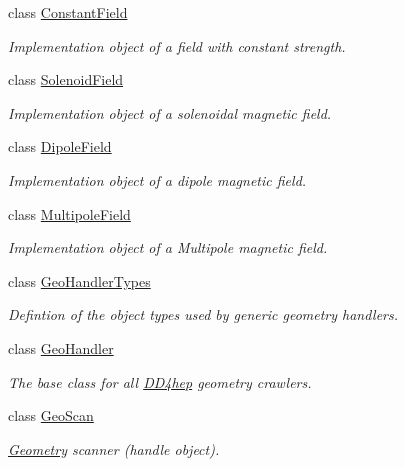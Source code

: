 \begin{DoxyCompactItemize}
class \hyperlink{class_d_d4hep_1_1_geometry_1_1_constant_field}{ConstantField}
\begin{DoxyCompactList}\small\item\em Implementation object of a field with constant strength. \item\end{DoxyCompactList}\item 
class \hyperlink{class_d_d4hep_1_1_geometry_1_1_solenoid_field}{SolenoidField}
\begin{DoxyCompactList}\small\item\em Implementation object of a solenoidal magnetic field. \item\end{DoxyCompactList}\item 
class \hyperlink{class_d_d4hep_1_1_geometry_1_1_dipole_field}{DipoleField}
\begin{DoxyCompactList}\small\item\em Implementation object of a dipole magnetic field. \item\end{DoxyCompactList}\item 
class \hyperlink{class_d_d4hep_1_1_geometry_1_1_multipole_field}{MultipoleField}
\begin{DoxyCompactList}\small\item\em Implementation object of a Multipole magnetic field. \item\end{DoxyCompactList}\item 
class \hyperlink{class_d_d4hep_1_1_geometry_1_1_geo_handler_types}{GeoHandlerTypes}
\begin{DoxyCompactList}\small\item\em Defintion of the object types used by generic geometry handlers. \item\end{DoxyCompactList}\item 
class \hyperlink{class_d_d4hep_1_1_geometry_1_1_geo_handler}{GeoHandler}
\begin{DoxyCompactList}\small\item\em The base class for all \hyperlink{namespace_d_d4hep}{DD4hep} geometry crawlers. \item\end{DoxyCompactList}\item 
class \hyperlink{class_d_d4hep_1_1_geometry_1_1_geo_scan}{GeoScan}
\begin{DoxyCompactList}\small\item\em \hyperlink{namespace_d_d4hep_1_1_geometry}{Geometry} scanner (handle object). \item\end{DoxyCompactList}\item 

\end{DoxyCompactItemize}
